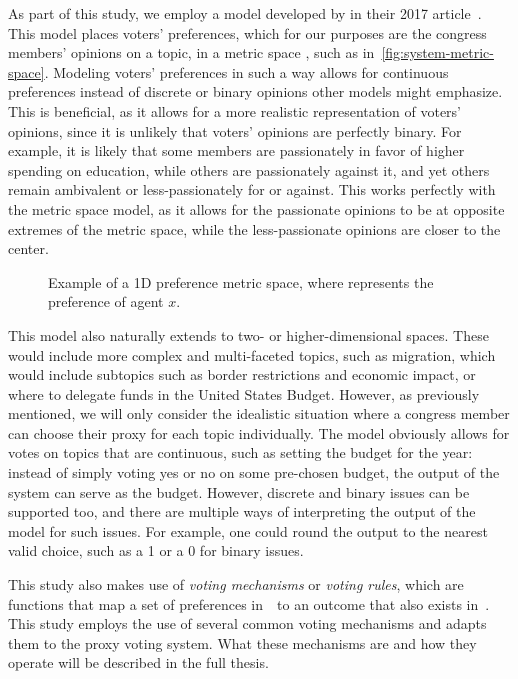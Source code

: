 As part of this study, we employ a model developed by  in
their 2017 article~\cite{Cohensius2017}.
This model places voters' preferences, which for our purposes are the congress
members' opinions on a topic, in a metric space \systemspace, such as
in~\autoref{fig:system-metric-space}.
Modeling voters' preferences in such a way allows for continuous preferences instead of
discrete or binary opinions other models might emphasize.
This is beneficial, as it allows for a more realistic representation of voters'
opinions, since it is unlikely that voters' opinions are perfectly binary.
For example, it is likely that some members are  passionately in favor of higher
spending on education, while others are passionately against it, and yet others
remain ambivalent or less-passionately for or against.
This works perfectly with the metric space model, as it allows for the passionate
opinions to be at opposite extremes of the metric space, while the less-passionate
opinions are closer to the center.

\begin{figure}[htbp]
    \centering
    
    \caption{Example of a 1D preference metric space, where  represents the
    preference of agent $x$.}
    \label{fig:system-metric-space}
\end{figure}

This model also naturally extends to two- or higher-dimensional spaces.
These would include more complex and multi-faceted topics, such as migration, which
would include subtopics such as border restrictions and economic impact, or where to
delegate funds in the United States Budget.
However, as previously mentioned, we will only consider the idealistic situation
where a congress member can choose their proxy for each topic individually.
The model obviously allows for votes on topics that are continuous, such as setting the
budget for the year: instead of simply voting yes or no on some pre-chosen budget,
the output of the system can serve as the budget.
However, discrete and binary issues can be supported too, and there are multiple
ways of interpreting the output of the model for such issues.
For example, one could round the output to the nearest valid choice, such as a 1 or a
0 for binary issues.

This study also makes use of \textit{voting mechanisms} or \textit{voting rules},
which are functions that map a set of preferences in~\systemspace\ to an outcome that
also exists in~\systemspace.
%
%
This study employs the use of several common voting mechanisms and adapts them to the
proxy voting system.
What these mechanisms are and how they operate will be described in the full thesis.

